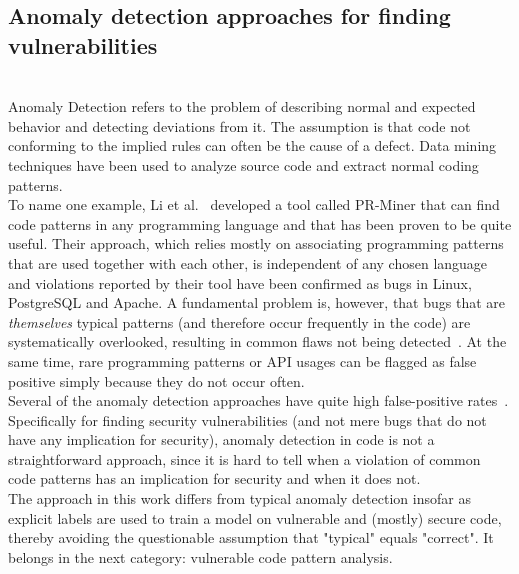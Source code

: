 \documentclass[
a4paper,
pagesize,
pdftex,
12pt,
twoside, %
BCOR=5mm, %
ngerman,
fleqn,
final,
]{scrartcl}
\begin{document}
	\subsection{Anomaly detection approaches for finding vulnerabilities}\mbox{}\\
	Anomaly Detection refers to the problem of describing normal and expected behavior and detecting deviations from it. The assumption is that code not conforming to the implied rules can often be the cause of a defect. Data mining techniques have been used to analyze source code and extract normal coding patterns.\\
	To name one example, Li et al.~\cite{Li.2005} developed a tool called PR-Miner that can find code patterns in any programming language and that has been proven to be quite useful. Their approach, which relies mostly on associating programming patterns that are used together with each other, is independent of any chosen language and violations reported by their tool have been confirmed as bugs in Linux, PostgreSQL and Apache. A fundamental problem is, however, that bugs that are \textit{themselves} typical patterns (and therefore occur frequently in the code) are systematically overlooked, resulting in common flaws not being detected~\cite{Yamaguchi.2012}. At the same time, rare programming patterns or API usages can be flagged as false positive simply because they do not occur often.\\
	Several of the anomaly detection approaches have quite high false-positive rates~\cite{Ghaffarian.2017}. Specifically for finding security vulnerabilities (and not mere bugs that do not have any implication for security), anomaly detection in code is not a straightforward approach, since it is hard to tell when a violation of common code patterns has an implication for security and when it does not.\\
	The approach in this work differs from typical anomaly detection insofar as explicit labels are used to train a model on vulnerable and (mostly) secure code, thereby avoiding the questionable assumption that "typical" equals "correct". It belongs in the next category: vulnerable code pattern analysis. 
	
\end{document}
